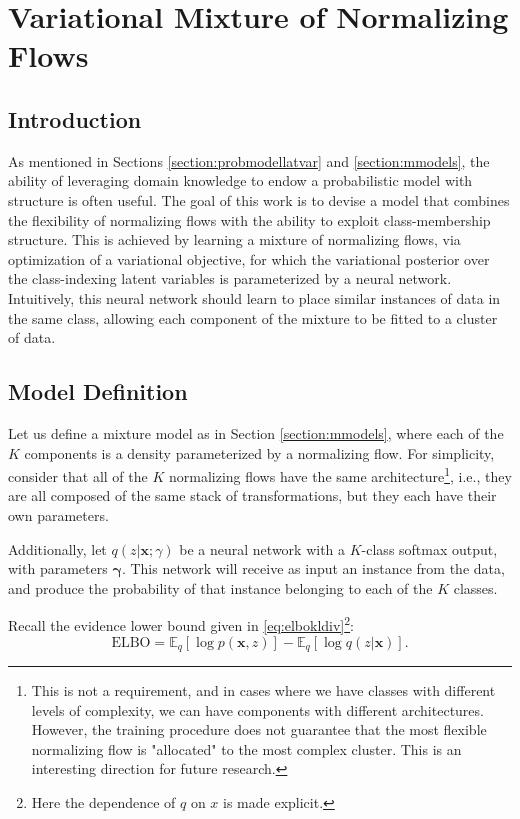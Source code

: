 \chapter{Variational Mixture of Normalizing Flows}
\label{chapter:vmonf}

\section{Introduction}
\label{section:vmonf-intro}

As mentioned in Sections \ref{section:probmodellatvar} and \ref{section:mmodels},
the ability of leveraging domain knowledge to endow a probabilistic model with
structure is often useful. The goal of this work is to devise a model that combines
the flexibility of normalizing flows with the ability to exploit class-membership
structure. This is achieved by learning a mixture of normalizing flows, via
optimization of a variational objective, for which the variational posterior
over the class-indexing latent variables is parameterized by a neural network.
Intuitively, this neural network should learn to place similar instances of
data in the same class, allowing each component of the mixture to be fitted
to a cluster of data.

\section{Model Definition}

Let us define a mixture model as in Section \ref{section:mmodels}, where each of
the $K$ components is a density parameterized by a normalizing flow. For simplicity,
consider that all of the $K$ normalizing flows have the same
architecture\footnote{This is not a requirement,
and in cases where we have classes with different levels of complexity, we can
have components with different architectures. However, the training procedure
does not guarantee that the most flexible normalizing flow is "allocated"
to the most complex cluster. This is an interesting direction for future
research.}, i.e., they are all composed of the same stack of transformations,
but they each have their own parameters.

Additionally, let $q(z|\bm{x};\gamma)$ be a neural network with a $K$-class softmax
output, with parameters $\bm\gamma$. This network will receive as input an instance from the
data, and produce the probability of that instance belonging to each of the
$K$ classes.

Recall the evidence lower bound given in \ref{eq:elbokldiv}\footnote{Here the
dependence of $q$ on $x$ is made explicit.}:
\begin{equation*}
    \text{ELBO} = \mathbb{E}_q [\log p(\bm{x}, z)] - \mathbb{E}_q [\log q(z|\bm{x})].
\end{equation*}

